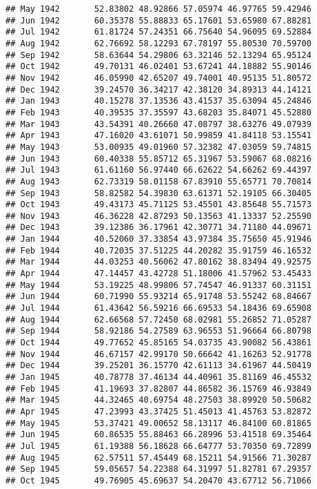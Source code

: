 \documentclass[
]{article}
\begin{document}
\begin{verbatim}
## May 1942       52.83802 48.92866 57.05974 46.97765 59.42946
## Jun 1942       60.35378 55.88833 65.17601 53.65980 67.88281
## Jul 1942       61.81724 57.24351 66.75640 54.96095 69.52884
## Aug 1942       62.76692 58.12293 67.78197 55.80530 70.59700
## Sep 1942       58.63644 54.29806 63.32146 52.13294 65.95124
## Oct 1942       49.70131 46.02401 53.67241 44.18882 55.90146
## Nov 1942       46.05990 42.65207 49.74001 40.95135 51.80572
## Dec 1942       39.24570 36.34217 42.38120 34.89313 44.14121
## Jan 1943       40.15278 37.13536 43.41537 35.63094 45.24846
## Feb 1943       40.39535 37.35597 43.68203 35.84071 45.52880
## Mar 1943       43.54391 40.26660 47.08797 38.63276 49.07939
## Apr 1943       47.16020 43.61071 50.99859 41.84118 53.15541
## May 1943       53.00935 49.01960 57.32382 47.03059 59.74815
## Jun 1943       60.40338 55.85712 65.31967 53.59067 68.08216
## Jul 1943       61.61160 56.97440 66.62622 54.66262 69.44397
## Aug 1943       62.73319 58.01158 67.83910 55.65771 70.70814
## Sep 1943       58.82582 54.39830 63.61371 52.19105 66.30405
## Oct 1943       49.43173 45.71125 53.45501 43.85648 55.71573
## Nov 1943       46.36228 42.87293 50.13563 41.13337 52.25590
## Dec 1943       39.12386 36.17961 42.30771 34.71180 44.09671
## Jan 1944       40.52060 37.33854 43.97384 35.75650 45.91946
## Feb 1944       40.72035 37.51225 44.20282 35.91759 46.16532
## Mar 1944       44.03253 40.56062 47.80162 38.83494 49.92575
## Apr 1944       47.14457 43.42728 51.18006 41.57962 53.45433
## May 1944       53.19225 48.99806 57.74547 46.91337 60.31151
## Jun 1944       60.71990 55.93214 65.91748 53.55242 68.84667
## Jul 1944       61.43642 56.59216 66.69533 54.18436 69.65908
## Aug 1944       62.66568 57.72450 68.02981 55.26852 71.05287
## Sep 1944       58.92186 54.27589 63.96553 51.96664 66.80798
## Oct 1944       49.77652 45.85165 54.03735 43.90082 56.43861
## Nov 1944       46.67157 42.99170 50.66642 41.16263 52.91778
## Dec 1944       39.25201 36.15770 42.61113 34.61967 44.50419
## Jan 1945       40.78778 37.46134 44.40961 35.81169 46.45532
## Feb 1945       41.19693 37.82807 44.86582 36.15769 46.93849
## Mar 1945       44.32465 40.69754 48.27503 38.89920 50.50682
## Apr 1945       47.23993 43.37425 51.45013 41.45763 53.82872
## May 1945       53.37421 49.00652 58.13117 46.84100 60.81865
## Jun 1945       60.86535 55.88463 66.28996 53.41518 69.35464
## Jul 1945       61.19388 56.18628 66.64777 53.70350 69.72899
## Aug 1945       62.57511 57.45449 68.15211 54.91566 71.30287
## Sep 1945       59.05657 54.22388 64.31997 51.82781 67.29357
## Oct 1945       49.76905 45.69637 54.20470 43.67712 56.71066

\end{verbatim}
\end{document}
